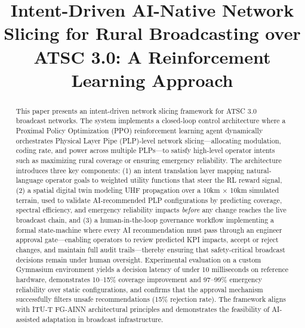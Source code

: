 \documentclass[conference]{IEEEtran}
\begin{document}
\title{Intent-Driven AI-Native Network Slicing for Rural Broadcasting over ATSC 3.0: A Reinforcement Learning Approach}

\author{%
%
%
}


\maketitle

\begin{abstract}
This paper presents an intent-driven network slicing framework for ATSC 3.0 broadcast networks. The system implements a closed-loop control architecture where a Proximal Policy Optimization (PPO) reinforcement learning agent dynamically orchestrates Physical Layer Pipe (PLP)-level network slicing—allocating modulation, coding rate, and power across multiple PLPs—to satisfy high-level operator intents such as maximizing rural coverage or ensuring emergency reliability. The architecture introduces three key components: (1) an intent translation layer mapping natural-language operator goals to weighted utility functions that steer the RL reward signal, (2) a spatial digital twin modeling UHF propagation over a 10km × 10km simulated terrain, used to validate AI-recommended PLP configurations by predicting coverage, spectral efficiency, and emergency reliability impacts \textit{before} any change reaches the live broadcast chain, and (3) a human-in-the-loop governance workflow implementing a formal state-machine where every AI recommendation must pass through an engineer approval gate—enabling operators to review predicted KPI impacts, accept or reject changes, and maintain full audit trails—thereby ensuring that safety-critical broadcast decisions remain under human oversight. Experimental evaluation on a custom Gymnasium environment yields a decision latency of under 10 milliseconds on reference hardware, demonstrates 10--15\% coverage improvement and 97--99\% emergency reliability over static configurations, and confirms that the approval mechanism successfully filters unsafe recommendations (15\% rejection rate). The framework aligns with ITU-T FG-AINN architectural principles and demonstrates the feasibility of AI-assisted adaptation in broadcast infrastructure.
\end{abstract}
\end{document}
